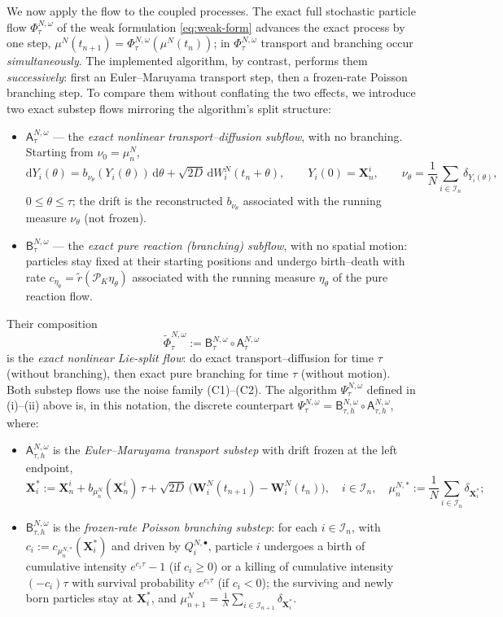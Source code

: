 \documentclass[a4paper,fleqn]{cas-sc}
\theoremstyle{definition}
\theoremstyle{remark}
\begin{document}
We now apply the flow to the coupled processes. The exact full stochastic
particle flow $\Phi^{N,\omega}_\tau$ of the weak formulation
\eqref{eq:weak-form} advances the exact process by one step,
$\mu^N(t_{n+1})=\Phi^{N,\omega}_\tau(\mu^N(t_n))$; in $\Phi^{N,\omega}_\tau$
transport and branching occur \emph{simultaneously}. The implemented algorithm,
by contrast, performs them \emph{successively}: first an Euler--Maruyama
transport step, then a frozen-rate Poisson branching step. To compare them
without conflating the two effects, we introduce two exact substep flows
mirroring the algorithm's split structure:
\begin{itemize}
\item $\mathsf A^{N,\omega}_\tau$ --- the \emph{exact nonlinear transport--diffusion
subflow}, with no branching. Starting from $\nu_0=\mu^N_n$,
\[
\mathrm dY_i(\theta)=b_{\nu_\theta}(Y_i(\theta))\,\mathrm d\theta
+\sqrt{2D}\,\mathrm dW^N_i(t_n+\theta),
\qquad Y_i(0)=\mathbf X^i_n,
\qquad
\nu_\theta=\frac1N\sum_{i\in\mathcal I_n}\delta_{Y_i(\theta)},
\]
$0\le\theta\le\tau$; the drift is the reconstructed $b_{\nu_\theta}$ associated
with the running measure $\nu_\theta$ (not frozen).
\item $\mathsf B^{N,\omega}_\tau$ --- the \emph{exact pure reaction (branching)
subflow}, with no spatial motion: particles stay fixed at their starting
positions and undergo birth--death with rate $c_{\eta_\theta}
=\tilde r(\mathcal P_K\eta_\theta)$ associated with the running measure
$\eta_\theta$ of the pure reaction flow.
\end{itemize}
Their composition
\[
\widetilde\Phi^{N,\omega}_\tau:=\mathsf B^{N,\omega}_\tau\circ\mathsf A^{N,\omega}_\tau
\]
is the \emph{exact nonlinear Lie-split flow}: do exact transport--diffusion for
time $\tau$ (without branching), then exact pure branching for time $\tau$
(without motion). Both substep flows use the noise family (C1)--(C2). The
algorithm $\Psi^{N,\omega}_\tau$ defined in (i)--(ii) above is, in this notation,
the discrete counterpart
$\Psi^{N,\omega}_\tau=\mathsf B^{N,\omega}_{\tau,h}\circ\mathsf A^{N,\omega}_{\tau,h}$,
where:
\begin{itemize}
\item[(i)] $\mathsf A^{N,\omega}_{\tau,h}$ is the \emph{Euler--Maruyama transport
substep} with drift frozen at the left endpoint,
\[
\mathbf X^*_i
:=\mathbf X^i_n+b_{\mu^N_n}(\mathbf X^i_n)\,\tau
+\sqrt{2D}\,\bigl(\mathbf W^N_i(t_{n+1})-\mathbf W^N_i(t_n)\bigr),
\quad i\in\mathcal I_n,
\quad
\mu^{N,*}_n:=\frac1N\sum_{i\in\mathcal I_n}\delta_{\mathbf X^*_i};
\]
\item[(ii)] $\mathsf B^{N,\omega}_{\tau,h}$ is the \emph{frozen-rate Poisson
branching substep}: for each $i\in\mathcal I_n$, with
$c_i:=c_{\mu^{N,*}_n}(\mathbf X^*_i)$ and driven by $Q^{N,\bullet}_i$, particle
$i$ undergoes a birth of cumulative intensity $e^{c_i\tau}-1$ (if $c_i\ge0$) or a
killing of cumulative intensity $(-c_i)\tau$ with survival probability
$e^{c_i\tau}$ (if $c_i<0$); the surviving and newly born particles stay at
$\mathbf X^*_i$, and
$\mu^N_{n+1}=\frac1N\sum_{i\in\mathcal I_{n+1}}\delta_{\mathbf X^*_i}$.
\end{itemize}
\end{document}
